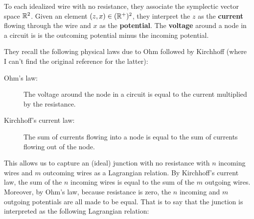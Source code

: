 To each idealized wire with no resistance, they associate the symplectic vector space $\mathbb{R}^{2}$.  Given an element $(z,x) \in (\mathbb{R}^+)^2$,  they interpret the $z$ as the {\bf current} flowing through the wire and $x$ as the {\bf potential}. The {\bf voltage} around a node in a circuit is is the outcoming potential minus the incoming potential.

They recall the following physical laws due to Ohm \cite{ohm} followed by Kirchhoff (where I can't find the original reference for the latter):
\begin{description}
\item[Ohm's law:]  The voltage around the node in a circuit is equal to the current multiplied by the resistance.
\item[Kirchhoff's current law:] The sum of currents flowing into a node is equal to the sum of currents flowing out of the node.
\end{description}
This allows us to capture an (ideal) junction with no resistance with $n$ incoming wires and $m$ outcoming wires as a Lagrangian relation.  By Kirchhoff's current law, the sum of the $n$ incoming wires is equal to the sum of the $m$ outgoing wires.  Moreover, by Ohm's law, because resistance is zero, the $n$ incoming and $m$ outgoing potentials are all made to be equal.  That is to say that the junction is interpreted as the following Lagrangian relation:
